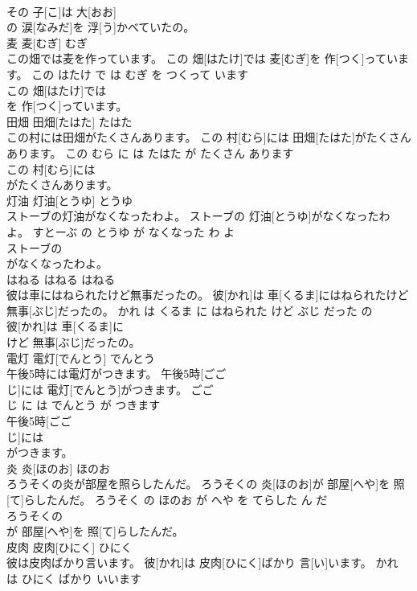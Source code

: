 \documentclass[8pt]{extreport}
\begin{document}
\begin{CJK}{UTF8}{min}
\\	その 子[こ]は 大[おお]
\\	の 涙[なみだ]を 浮[う]かべていたの。			
\\	麦	麦[むぎ]	むぎ	
\\	この畑では麦を作っています。	この 畑[はたけ]では 麦[むぎ]を 作[つく]っています。	この はたけ で は むぎ を つくって います	
\\	この 畑[はたけ]では
\\	を 作[つく]っています。			
\\	田畑	田畑[たはた]	たはた	
\\	この村には田畑がたくさんあります。	この 村[むら]には 田畑[たはた]がたくさんあります。	この むら に は たはた が たくさん あります	
\\	この 村[むら]には
\\	がたくさんあります。			
\\	灯油	灯油[とうゆ]	とうゆ	
\\	ストーブの灯油がなくなったわよ。	ストーブの 灯油[とうゆ]がなくなったわよ。	すとーぶ の とうゆ が なくなった わ よ	
\\	ストーブの
\\	がなくなったわよ。			
\\	はねる	はねる	はねる	
\\	彼は車にはねられたけど無事だったの。	彼[かれ]は 車[くるま]にはねられたけど 無事[ぶじ]だったの。	かれ は くるま に はねられた けど ぶじ だった の	
\\	彼[かれ]は 車[くるま]に
\\	けど 無事[ぶじ]だったの。			
\\	電灯	電灯[でんとう]	でんとう	
\\	午後5時には電灯がつきます。	午後5時[ごご 
\\	じ]には 電灯[でんとう]がつきます。	ごご 
\\	じ に は でんとう が つきます	
\\	午後5時[ごご 
\\	じ]には
\\	がつきます。			
\\	炎	炎[ほのお]	ほのお	
\\	ろうそくの炎が部屋を照らしたんだ。	ろうそくの 炎[ほのお]が 部屋[へや]を 照[て]らしたんだ。	ろうそく の ほのお が へや を てらした ん だ	
\\	ろうそくの
\\	が 部屋[へや]を 照[て]らしたんだ。			
\\	皮肉	皮肉[ひにく]	ひにく	
\\	彼は皮肉ばかり言います。	彼[かれ]は 皮肉[ひにく]ばかり 言[い]います。	かれ は ひにく ばかり いいます	

\end{CJK}
\end{document}
